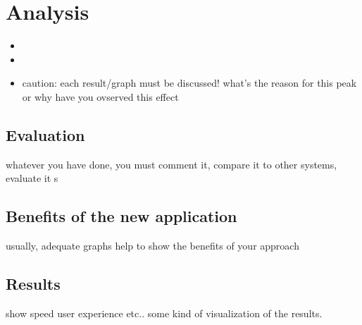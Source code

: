 \chapter{Analysis}
\begin{itemize}
	\item 
	\item 
	\item caution: each result/graph must be discussed! what's the reason for this peak or why have you ovserved this effect
\end{itemize}

\section{Evaluation}
whatever you have done, you must comment it, compare it to other systems, evaluate it
s
\section{Benefits of the new application}
usually, adequate graphs help to show the benefits of your approach

\section{Results}
show speed user experience etc.. some kind of visualization of the results.